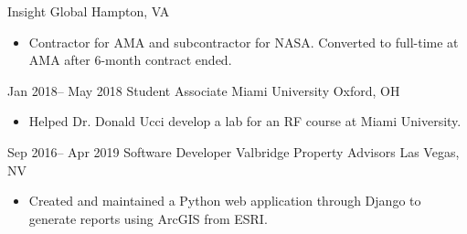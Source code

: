 \documentclass[10pt,legalpaper]{moderncv}
\begin{document}
{Insight Global}
{Hampton, VA}
{}
{
    \begin{itemize}
        \item{Contractor for AMA and subcontractor for NASA. Converted to full-time at AMA after 6-month contract ended.}
    \end{itemize}
}
\cventry
{Jan 2018-- May 2018  }
{Student Associate}
{Miami University}
{Oxford, OH}
{}
{
    \begin{itemize}
        \item{Helped Dr. Donald Ucci develop a lab for an RF course at Miami University.}
    \end{itemize}
}
\cventry
{Sep 2016-- Apr 2019  }
{Software Developer}
{Valbridge Property Advisors}
{Las Vegas, NV}
{}
{
    \begin{itemize}
        \item{Created and maintained a Python web application through Django to generate reports using ArcGIS from ESRI.}
    \end{itemize}
}
\newpage
\end{document}

